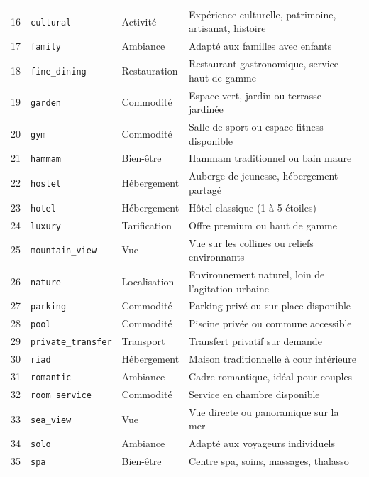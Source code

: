 \begin{center}
\begin{longtable}{r p{3.2cm} p{2.5cm} p{6.5cm}}
    16 & \texttt{cultural}          & Activité    & Expérience culturelle, patrimoine, artisanat, histoire \\
    17 & \texttt{family}            & Ambiance    & Adapté aux familles avec enfants \\
    18 & \texttt{fine\_dining}      & Restauration & Restaurant gastronomique, service haut de gamme \\
    19 & \texttt{garden}            & Commodité   & Espace vert, jardin ou terrasse jardinée \\
    20 & \texttt{gym}               & Commodité   & Salle de sport ou espace fitness disponible \\
    21 & \texttt{hammam}            & Bien-être   & Hammam traditionnel ou bain maure \\
    22 & \texttt{hostel}            & Hébergement & Auberge de jeunesse, hébergement partagé \\
    23 & \texttt{hotel}             & Hébergement & Hôtel classique (1 à 5 étoiles) \\
    24 & \texttt{luxury}            & Tarification & Offre premium ou haut de gamme \\
    25 & \texttt{mountain\_view}    & Vue         & Vue sur les collines ou reliefs environnants \\
    26 & \texttt{nature}            & Localisation & Environnement naturel, loin de l'agitation urbaine \\
    27 & \texttt{parking}           & Commodité   & Parking privé ou sur place disponible \\
    28 & \texttt{pool}              & Commodité   & Piscine privée ou commune accessible \\
    29 & \texttt{private\_transfer} & Transport   & Transfert privatif sur demande \\
    30 & \texttt{riad}              & Hébergement & Maison traditionnelle à cour intérieure \\
    31 & \texttt{romantic}          & Ambiance    & Cadre romantique, idéal pour couples \\
    32 & \texttt{room\_service}     & Commodité   & Service en chambre disponible \\
    33 & \texttt{sea\_view}         & Vue         & Vue directe ou panoramique sur la mer \\
    34 & \texttt{solo}              & Ambiance    & Adapté aux voyageurs individuels \\
    35 & \texttt{spa}               & Bien-être   & Centre spa, soins, massages, thalasso \\

\end{longtable}
\end{center}
